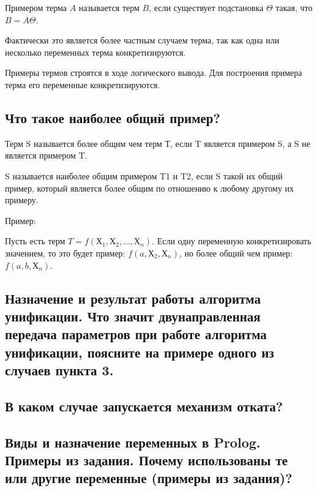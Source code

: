 \documentclass[a4paper,12pt]{article}
\begin{document}
Примером терма $A$ называется терм $B$, если существует подстановка $\Theta$ такая, что $B = A\Theta$.

Фактически это является более частным случаем терма, так как одна или несколько переменных терма конкретизируются.

Примеры термов строятся в ходе логического вывода. Для построения примера терма его переменные конкретизируются.
\subsection*{Что такое наиболее общий пример?
}
Терм S называется более общим чем терм Т, если T является примером S, а S не является примером T.

S называется наиболее общим примером T1 и T2, если S такой их общий пример, который является более общим по отношению к любому другому их примеру. 

Пример:

Пусть есть терм $T=f(Х_1, Х_2, \dots, Х_n)$. Если одну переменную конкретизировать значением, то это будет пример: $f(a, Х_2, Х_n)$, но более общий чем пример: $f(a, b, Х_n)$.
\subsection*{Назначение и результат работы алгоритма унификации. Что значит двунаправленная передача параметров при работе алгоритма унификации, поясните на примере одного из случаев пункта  3.}
\subsection*{В каком случае запускается механизм отката?
}
\subsection*{Виды и назначение переменных в Prolog. Примеры из задания.  Почему использованы те или другие переменные (примеры из задания)?}
\end{document}
